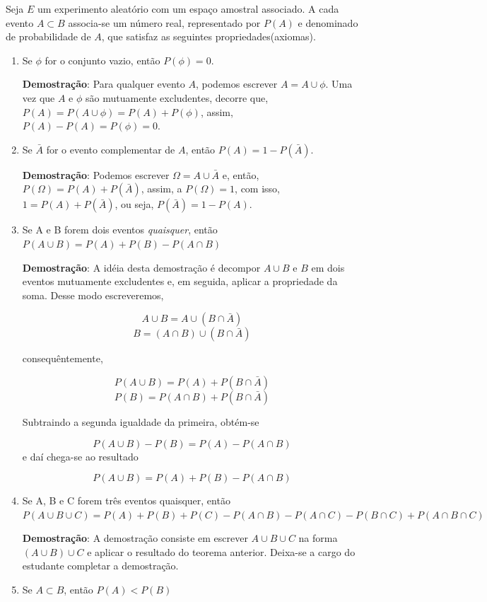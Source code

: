 \inic Seja $E$ um experimento aleatório com um espaço amostral associado. A cada evento $A \subset B$ associa-se um número real, representado por $P(A)$ e denominado de probabilidade de $A$, que satisfaz as seguintes propriedades(axiomas).

\begin{enumerate}
    \item Se $\phi$ for o conjunto vazio, então
    $P(\phi)=0$.

\textbf{Demostração}: Para qualquer evento $A$, podemos escrever
$A=A\cup \phi$. Uma vez que $A$ e $\phi$ são mutuamente
excludentes, decorre que, $P(A)=P(A\cup \phi)= P(A)+P(\phi)$,
assim, $P(A)- P(A)= P(\phi)= 0$.
    \item Se $\bar{A}$ for o evento complementar de $A$, então
    $P(A)=1-P(\bar{A})$.

\textbf{Demostração}: Podemos escrever $\Omega = A \cup \bar{A}$
e, então, $P(\Omega)= P(A)+ P(\bar{A})$, assim, a $P(\Omega)=1$,
com isso, $1= P(A)+P(\bar{A})$, ou seja, $P(\bar{A})= 1- P(A)$.
    \item Se A e B forem dois eventos \emph{quaisquer}, então $P(A\cup B)=P(A)+P(B)-P(A\cap B)$

\textbf{Demostração}: A idéia desta demostração é decompor $A\cup
B$ e $B$ em dois eventos mutuamente excludentes e, em seguida,
aplicar a propriedade da soma. Desse modo escreveremos,

$$A \cup B= A\cup (B\cap \bar{A})$$
$$B= (A \cap B) \cup (B\cap \bar{A})$$

consequêntemente,

$$P(A \cup B)= P(A)+P(B \cap \bar{A})$$
$$ P(B) = P(A \cap B) + P(B \cap \bar{A})$$

Subtraindo a segunda igualdade da primeira, obtém-se

$$ P(A \cup B) - P(B) = P(A)- P(A \cap B)$$
 e daí chega-se ao resultado

$$ P(A \cup B) = P(A)+P(B)- P(A \cap B)$$
    \item Se A, B e C forem três eventos quaisquer, então $P(A \cup B \cup C) = P(A)+P(B)+P(C)-P(A\cap B)-P(A\cap C)-P(B\cap C)+P(A\cap B \cap C)$


\textbf{ \maltese Demostração}: A demostração consiste em escrever
$A \cup B \cup C$ na forma $(A \cup B)\cup C$ e aplicar o
resultado do teorema anterior. Deixa-se a cargo do estudante
completar a demostração.

    \item Se $A \subset B$, então $P(A) < P(B)$
\end{enumerate}

